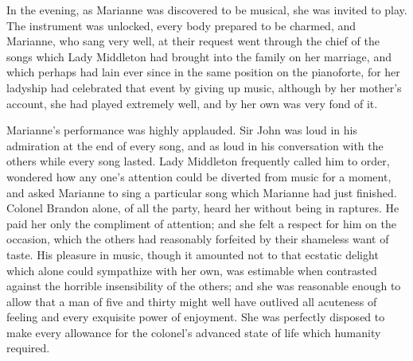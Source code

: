 In the evening, as Marianne was discovered to be musical, she was invited to play. The instrument was unlocked, every body prepared to be charmed, and Marianne, who sang very well, at their request went through the chief of the songs which Lady Middleton had brought into the family on her marriage, and which perhaps had lain ever since in the same position on the pianoforte, for her ladyship had celebrated that event by giving up music, although by her mother’s account, she had played extremely well, and by her own was very fond of it.

Marianne’s performance was highly applauded. Sir John was loud in his admiration at the end of every song, and as loud in his conversation with the others while every song lasted. Lady Middleton frequently called him to order, wondered how any one’s attention could be diverted from music for a moment, and asked Marianne to sing a particular song which Marianne had just finished. Colonel Brandon alone, of all the party, heard her without being in raptures. He paid her only the compliment of attention; and she felt a respect for him on the occasion, which the others had reasonably forfeited by their shameless want of taste. His pleasure in music, though it amounted not to that ecstatic delight which alone could sympathize with her own, was estimable when contrasted against the horrible insensibility of the others; and she was reasonable enough to allow that a man of five and thirty might well have outlived all acuteness of feeling and every exquisite power of enjoyment. She was perfectly disposed to make every allowance for the colonel’s advanced state of life which humanity required.